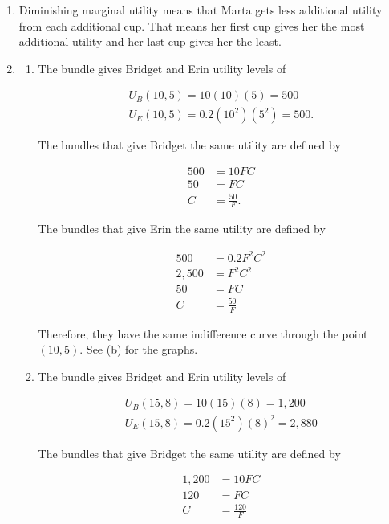 \documentclass{article}
\begin{document}
\begin{enumerate}
\begin{enumerate}
	\end{enumerate}
	
\item Diminishing marginal utility means that Marta gets less additional utility from each additional cup. That means her first cup gives her the most additional utility and her last cup gives her the least.

\item

	\begin{enumerate}
	
	\item The bundle gives Bridget and Erin utility levels of
	
		\begin{gather*}
		U_B(10, 5) = 10(10)(5) = 500 \\
		U_E(10,5) = 0.2(10^2)(5^2) = 500.
		\end{gather*}
		
		The bundles that give Bridget the same utility are defined by
		
		\begin{align*}
		500 &= 10FC \\
		50 &= FC \\
		C &= \frac{50}{F}.
		\end{align*}
		
		The bundles that give Erin the same utility are defined by
		
		\begin{align*}
		500 &= 0.2 F^2 C^2 \\
		2,500 &= F^2 C^2 \\
		50 &= F C \\
		C &= \frac{50}{F}
		\end{align*}
		
		Therefore, they have the same indifference curve through the point $(10,5)$. See (b) for the graphs.
	
	\item The bundle gives Bridget and Erin utility levels of
	
		\begin{gather*}
		U_B(15,8) = 10(15)(8) = 1,200 \\
		U_E(15, 8) = 0.2(15^2)(8)^2 = 2,880
		\end{gather*}
		
		The bundles that give Bridget the same utility are defined by
		
		\begin{align*}
		1,200 &= 10FC \\
		120 &= FC \\
		C &= \frac{120}{F}
		\end{align*}
		

\end{enumerate}
\end{enumerate}
\end{document}
